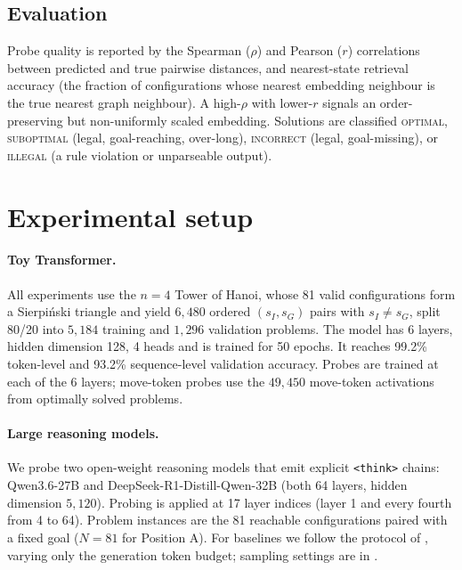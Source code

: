 \documentclass{article} %
\begin{document}
\subsection{Evaluation}
\label{sec:method-eval}

Probe quality is reported by the Spearman ($\rho$) and Pearson ($r$) correlations between predicted and true pairwise distances, and nearest-state retrieval accuracy (the fraction of configurations whose nearest embedding neighbour is the true nearest graph neighbour). A high-$\rho$ with lower-$r$ signals an order-preserving but non-uniformly scaled embedding. Solutions are classified \textsc{optimal}, \textsc{suboptimal} (legal, goal-reaching, over-long), \textsc{incorrect} (legal, goal-missing), or \textsc{illegal} (a rule violation or unparseable output).

\section{Experimental setup}
\label{sec:setup}

\paragraph{Toy Transformer.} All experiments use the $n=4$ Tower of Hanoi, whose 81 valid configurations form a Sierpi\'nski triangle and yield $6{,}480$ ordered $(s_I,s_G)$ pairs with $s_I\neq s_G$, split 80/20 into $5{,}184$ training and $1{,}296$ validation problems. The model has 6 layers, hidden dimension 128, 4 heads and is trained for 50 epochs. It reaches 99.2\% token-level and 93.2\% sequence-level validation accuracy. Probes are trained at each of the 6 layers; move-token probes use the $49{,}450$ move-token activations from optimally solved problems.

\paragraph{Large reasoning models.} We probe two open-weight reasoning models that emit explicit \texttt{<think>} chains: \mbox{Qwen3.6-27B} and \mbox{DeepSeek-R1-Distill-Qwen-32B} (both 64 layers, hidden dimension $5{,}120$). Probing is applied at 17 layer indices (layer 1 and every fourth from 4 to 64). Problem instances are the 81 reachable configurations paired with a fixed goal ($N=81$ for Position A). For baselines we follow the protocol of \citet{shojaee2025illusion}, varying only the generation token budget; sampling settings are in .
\end{document}
